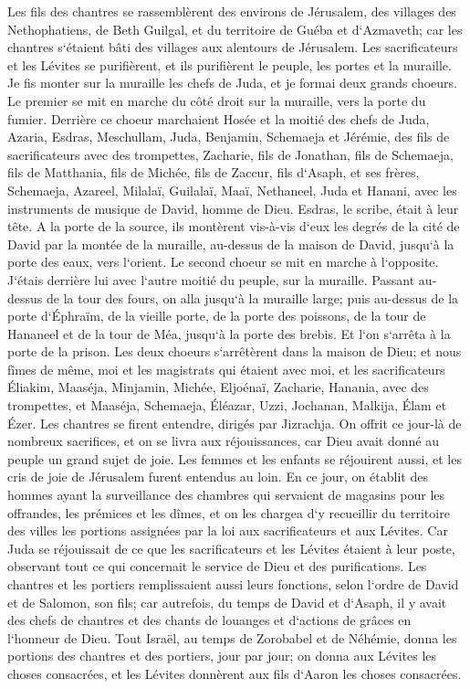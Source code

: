 \verse Les fils des chantres se rassemblèrent des environs de Jérusalem, des villages des Nethophatiens, 
\verse de Beth Guilgal, et du territoire de Guéba et d`Azmaveth; car les chantres s`étaient bâti des villages aux alentours de Jérusalem. 
\verse Les sacrificateurs et les Lévites se purifièrent, et ils purifièrent le peuple, les portes et la muraille. 
\verse Je fis monter sur la muraille les chefs de Juda, et je formai deux grands choeurs. Le premier se mit en marche du côté droit sur la muraille, vers la porte du fumier. 
\verse Derrière ce choeur marchaient Hosée et la moitié des chefs de Juda, 
\verse Azaria, Esdras, Meschullam, 
\verse Juda, Benjamin, Schemaeja et Jérémie, 
\verse des fils de sacrificateurs avec des trompettes, Zacharie, fils de Jonathan, fils de Schemaeja, fils de Matthania, fils de Michée, fils de Zaccur, fils d`Asaph, 
\verse et ses frères, Schemaeja, Azareel, Milalaï, Guilalaï, Maaï, Nethaneel, Juda et Hanani, avec les instruments de musique de David, homme de Dieu. Esdras, le scribe, était à leur tête. 
\verse A la porte de la source, ils montèrent vis-à-vis d`eux les degrés de la cité de David par la montée de la muraille, au-dessus de la maison de David, jusqu`à la porte des eaux, vers l`orient. 
\verse Le second choeur se mit en marche à l`opposite. J`étais derrière lui avec l`autre moitié du peuple, sur la muraille. Passant au-dessus de la tour des fours, on alla jusqu`à la muraille large; 
\verse puis au-dessus de la porte d`Éphraïm, de la vieille porte, de la porte des poissons, de la tour de Hananeel et de la tour de Méa, jusqu`à la porte des brebis. Et l`on s`arrêta à la porte de la prison. 
\verse Les deux choeurs s`arrêtèrent dans la maison de Dieu; et nous fîmes de même, moi et les magistrats qui étaient avec moi, 
\verse et les sacrificateurs Éliakim, Maaséja, Minjamin, Michée, Eljoénaï, Zacharie, Hanania, avec des trompettes, 
\verse et Maaséja, Schemaeja, Éléazar, Uzzi, Jochanan, Malkija, Élam et Ézer. Les chantres se firent entendre, dirigés par Jizrachja. 
\verse On offrit ce jour-là de nombreux sacrifices, et on se livra aux réjouissances, car Dieu avait donné au peuple un grand sujet de joie. Les femmes et les enfants se réjouirent aussi, et les cris de joie de Jérusalem furent entendus au loin. 
\verse En ce jour, on établit des hommes ayant la surveillance des chambres qui servaient de magasins pour les offrandes, les prémices et les dîmes, et on les chargea d`y recueillir du territoire des villes les portions assignées par la loi aux sacrificateurs et aux Lévites. Car Juda se réjouissait de ce que les sacrificateurs et les Lévites étaient à leur poste, 
\verse observant tout ce qui concernait le service de Dieu et des purifications. Les chantres et les portiers remplissaient aussi leurs fonctions, selon l`ordre de David et de Salomon, son fils; 
\verse car autrefois, du temps de David et d`Asaph, il y avait des chefs de chantres et des chants de louanges et d`actions de grâces en l`honneur de Dieu. 
\verse Tout Israël, au temps de Zorobabel et de Néhémie, donna les portions des chantres et des portiers, jour par jour; on donna aux Lévites les choses consacrées, et les Lévites donnèrent aux fils d`Aaron les choses consacrées. 

